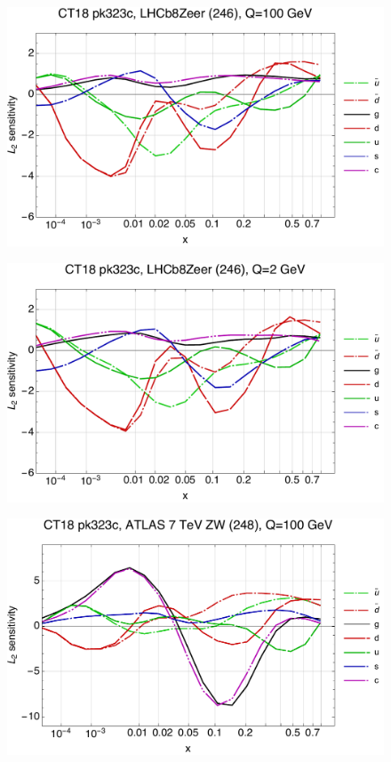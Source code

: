 \documentclass[10pt,aps,prd,floatfix,titlepage]{revtex4}
\begin{document}
\clearpage
\begin{figure}
\includegraphics[width=\textwidth,height=0.44\textheight,keepaspectratio]{1/246_ct18nn_L2_q100_Sf_1.pdf}
\caption{}
\end{figure}
\begin{figure}
\includegraphics[width=\textwidth,height=0.44\textheight,keepaspectratio]{1/246_ct18nn_L2_q2_Sf_1.pdf}
\caption{}
\end{figure}
\clearpage
\begin{figure}
\includegraphics[width=\textwidth,height=0.44\textheight,keepaspectratio]{1/248_ct18nn_L2_q100_Sf_1.pdf}
\caption{}
\end{figure}
\end{document}
